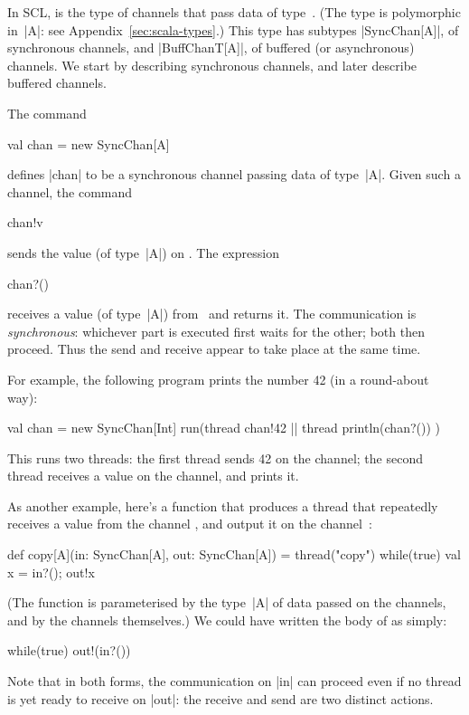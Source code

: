

In SCL,  is the type of channels that
pass data of type~.  (The type is polymorphic in~|A|: see
Appendix~\ref{sec:scala-types}.)  This type has subtypes
|SyncChan[A]|, of synchronous channels, and
|BuffChanT[A]|, of buffered (or asynchronous)
channels.  We  start by describing synchronous channels, and later
describe buffered channels.

The command
\begin{scala}
  val chan = new SyncChan[A]
\end{scala}
defines |chan| to be a synchronous channel passing
data of type~|A|.  Given such a channel, the command
\begin{scala}
  chan!v
\end{scala}
sends the value  (of type~|A|) on .  The
expression 
\begin{scala}
  chan?()
\end{scala}
receives a value (of type~|A|) from~ and returns it.  The
communication is
\emph{synchronous}: whichever part is executed first waits for the other; both
then proceed.  Thus the send and receive appear to take place at the same
time.  


For example, the following program prints the number 42 (in a round-about
way): 
\begin{scala}
  val chan = new SyncChan[Int]
  run(thread{ chan!42 } || thread{ println(chan?()) }) 
\end{scala}
%
This runs two threads: the first thread sends 42 on the channel; the second
thread receives a value on the channel, and prints it.


As another example, here's a function that produces a thread that repeatedly
receives a value from the channel , and output it on the
channel~:%
%
\begin{scala}
  def copy[A](in: SyncChan[A], out: SyncChan[A]) = thread("copy"){
    while(true){ val x = in?(); out!x }
  }
\end{scala}
%
(The function is parameterised by the type~|A| of data passed on the channels,
and by the channels themselves.)
%
We could have written the body of  as simply:
\begin{scala}
  while(true) out!(in?()) 
\end{scala}
Note that in both forms, the communication on |in| can proceed even if no
thread is yet ready to receive on |out|: the receive and send are two distinct
actions.

